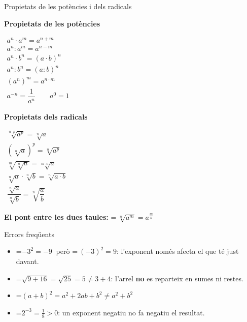 \documentclass[11pt,a4paper]{article}
\newcommand{\fmm}[1]{\setbox0=\hbox{$#1$}\ifdim\wd0>\linewidth\fmdisp{#1}\else\mbox{\box0}\fi}
\newcommand{\fmdisp}[1]{\[\setbox2=\hbox{$\displaystyle #1$}\ifdim\wd2>\linewidth\resizebox{\linewidth}{!}{\box2}\else\box2\fi\]}
\newcommand{\fmuline}[1]{\textbf{\color{fmaccent}#1}}
\begin{document}
\begin{fmdef}{Propietats de les potències i dels radicals}
\par\noindent \begin{minipage}[t]{0.48\linewidth}\vspace{0pt}\centering\textbf{Propietats de les potències}
\par $\displaystyle \begin{array}{l} a^n\cdot a^m=a^{n+m}\\[0pt] a^n : a^m=a^{n-m}\\[0pt] a^n\cdot b^n=(a\cdot b)^n\\[0pt] a^n : b^n=(a:b)^n\\[0pt] (a^n)^m=a^{n\cdot m}\\[0pt] a^{-n}=\dfrac{1}{a^n}\qquad a^0=1\end{array}$\par
\end{minipage}\hfill\begin{minipage}[t]{0.48\linewidth}\vspace{0pt}\centering\textbf{Propietats dels radicals}
\par $\displaystyle \begin{array}{l} \sqrt[n\cdot p]{a^{p}}=\sqrt[n]{a}\\[0pt] \left(\sqrt[n]{a}\right)^p=\sqrt[n]{a^p}\\[0pt] \sqrt[m]{\sqrt[n]{a}}=\sqrt[m\cdot n]{a}\\[0pt] \sqrt[n]{a}\cdot\sqrt[n]{b}=\sqrt[n]{a\cdot b}\\[0pt] \dfrac{\sqrt[n]{a}}{\sqrt[n]{b}}=\sqrt[n]{\dfrac ab}\end{array}$\par
\end{minipage}\par
\begin{fmnote}[before skip=4pt,after skip=0pt,top=0.5mm,bottom=0.5mm]\fmuline{El pont entre les dues taules:} \fmm{\ \sqrt[n]{a^m}=a^{\frac mn}}\end{fmnote}
\end{fmdef}

\begin{fmprop}{Errors freqüents}
\begin{itemize}
\item \fmm{-3^2=-9\ } però \fmm{\ (-3)^2=9}: l'exponent només afecta el que té just davant.
\item \fmm{\sqrt{9+16}=\sqrt{25}=5\neq3+4}: l'arrel \textbf{no} es reparteix en sumes ni restes.
\item \fmm{(a+b)^2=a^2+2ab+b^2\neq a^2+b^2}
\item \fmm{2^{-3}=\frac18\gt0}: un exponent negatiu no fa negatiu el resultat.
\end{itemize}
\end{fmprop}
\end{document}
